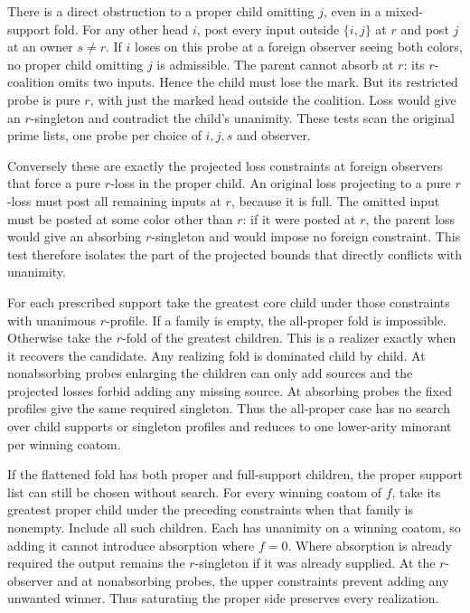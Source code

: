 There is a direct obstruction to a proper child
omitting $j$, even in a mixed-support fold. For
any other head $i$, post every input outside
$\{i,j\}$ at $r$ and post $j$ at an owner $s\ne r$.
If $i$ loses on this probe at a foreign observer
seeing both colors, no proper child omitting $j$
is admissible. The parent cannot absorb at $r$:
its $r$-coalition omits two inputs. Hence the
child must lose the mark. But its restricted probe
is pure $r$, with just the marked head outside the
coalition. Loss would give an $r$-singleton and
contradict the child's unanimity. These tests scan
the original prime lists, one probe per choice
of $i,j,s$ and observer.

Conversely these are exactly the projected loss
constraints at foreign observers that force a
pure $r$-loss in the proper child. An original
loss projecting to a pure $r$-loss must post all
remaining inputs at $r$, because it is full. The
omitted input must be posted at some color other
than $r$: if it were posted at $r$, the parent
loss would give an absorbing $r$-singleton and
would impose no foreign constraint. This test
therefore isolates the part of the projected
bounds that directly conflicts with unanimity.

For each prescribed support take the greatest core
child under those constraints with unanimous
$r$-profile. If a family is empty, the all-proper
fold is impossible. Otherwise take the $r$-fold
of the greatest children. This is a realizer
exactly when it recovers the candidate. Any
realizing fold is dominated child by child. At
nonabsorbing probes enlarging the children can
only add sources and the projected losses forbid
adding any missing source. At absorbing probes the
fixed profiles give the same required singleton.
Thus the all-proper case has no search over child
supports or singleton profiles and reduces to
one lower-arity minorant per winning coatom.

If the flattened fold has both proper and
full-support children, the proper support list
can still be chosen without search. For every
winning coatom of $f$, take its greatest proper
child under the preceding constraints when that
family is nonempty. Include all such children.
Each has unanimity on a winning coatom, so adding
it cannot introduce absorption where $f=0$.
Where absorption is already required the output
remains the $r$-singleton if it was already supplied.
At the $r$-observer and at nonabsorbing probes,
the upper constraints prevent adding any unwanted
winner. Thus saturating the proper side preserves
every realization.


